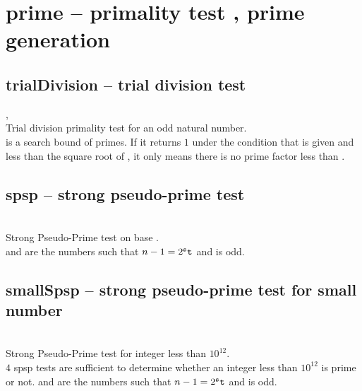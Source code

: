 

 \section{prime -- primality test , prime generation}
%
  \subsection{trialDivision -- trial division test}
   {,\ }{}\\
   \spacing
   \quad Trial division primality test for an odd natural number.\\
   \spacing
   \quad {} is a search bound of primes. 
   If it returns \(1\) under the condition that  is given and 
   less than the square root of , 
   it only means there is no prime factor less than .
%
  \subsection{spsp -- strong pseudo-prime test}
   \\
   \spacing
   \quad Strong Pseudo-Prime test on base .\\
   \spacing
   \quad {} and  are the numbers such that $n-1 = 2^{\texttt s}{\texttt t}$ and  is odd.
%
 \subsection{smallSpsp -- strong pseudo-prime test for small number}
   \\
   \spacing
   \quad Strong Pseudo-Prime test for integer  less than $10^{12}$.\\
   \spacing
   \quad $4$ spsp tests are sufficient to determine whether an integer less than $10^{12}$ is prime or not.
   \spacing
   \quad {} and  are the numbers such that $n-1 = 2^{\texttt s}{\texttt t}$ and  is odd.
%

